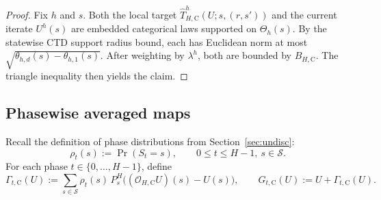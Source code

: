 \documentclass{article}
\newcommand{\X}{\mathcal{S}}
\begin{document}
\begin{proof}
Fix $h$ and $s$. Both the local target $\widehat T_{H,\mathrm C}^h(U;s,(r,s'))$ and the current iterate $U^h(s)$ are embedded categorical laws supported on $\Theta_h(s)$. By the statewise CTD support radius bound, each has Euclidean norm at most $\sqrt{\theta_{h,d}(s)-\theta_{h,1}(s)}$. After weighting by $\lambda^h$, both are bounded by $B_{H,\mathrm C}$. The triangle inequality then yields the claim.
\end{proof}

\subsection{Phasewise averaged maps}
Recall the definition of phase distributions from Section~\ref{sec:undisc}:
\begin{equation}
\rho_t(s):=\Pr(S_t=s), \qquad 0\le t\le H-1,\ s\in \X.
\end{equation}
For each phase $t\in\{0,\dots,H-1\}$, define
\begin{equation}
\Gamma_{t,\mathrm C}(U) := \sum_{s\in \X}\rho_t(s)\, P_s^H\bigl((\mathcal O_{H,\mathrm C}U)(s)-U(s)\bigr), \qquad G_{t,\mathrm C}(U):=U+\Gamma_{t,\mathrm C}(U).
\end{equation}
\end{document}
